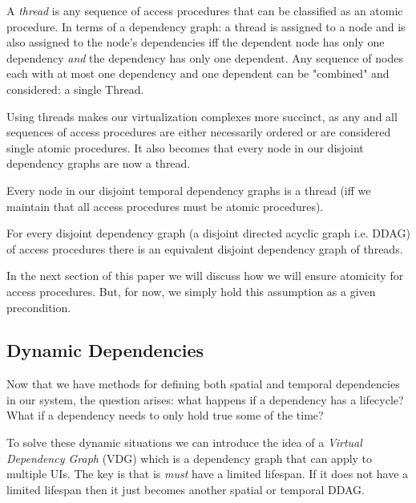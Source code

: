 \begin{con-def}[Thread]
	\label{thread}
	A \textit{thread} is any sequence of access procedures that can be classified as an atomic procedure. In terms of a dependency graph: a thread is assigned to a node and is also assigned to the node's dependencies iff the dependent node has only one dependency \textit{and} the dependency has only one dependent. Any sequence of nodes each with at most one dependency and one dependent can be "combined" and considered: a single Thread.
\end{con-def}

Using threads makes our virtualization complexes more succinct, as any and all sequences of access procedures are either necessarily ordered or are considered single atomic procedures. It also becomes that every node in our disjoint dependency graphs are now a thread.

\begin{props}
	\label{nodes-are-threads}
	Every node in our disjoint temporal dependency graphs is a thread (iff we maintain that all access procedures must be atomic procedures).
\end{props}

\begin{con-cor}
	\label{thread-ddag}
	For every disjoint dependency graph (a disjoint directed acyclic graph i.e. DDAG) of access procedures there is an equivalent disjoint dependency graph of threads.
\end{con-cor}

In the next section of this paper we will discuss how we will ensure atomicity for access procedures. But, for now, we simply hold this assumption as a given precondition.

\subsection{Dynamic Dependencies}

Now that we have methods for defining both spatial and temporal dependencies in our system, the question arises: what happens if a dependency has a lifecycle? What if a dependency needs to only hold true some of the time?

To solve these dynamic situations we can introduce the idea of a \textit{Virtual Dependency Graph} (VDG) which is a dependency graph that can apply to multiple UIs. The key is that is \textit{must} have a limited lifespan. If it does not have a limited lifespan then it just becomes another spatial or temporal DDAG.

